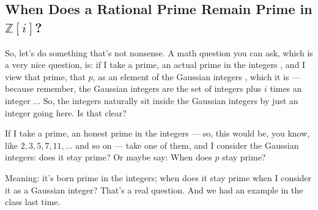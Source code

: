 \subsection{When Does a Rational Prime Remain Prime in \texorpdfstring{$\mathbb{Z}[i]$}{Z[i]}?}

\begin{speech}[00:02:48 - 00:04:08]
So, let's do something that's not nonsense. A math question you can ask, which is a very nice question, is: if I take a prime, an actual prime in the integers , and I view that prime, that $p$, as an element of the Gaussian integers , which it is --- because remember, the Gaussian integers are the set of integers plus $i$ times an integer ... So, the integers naturally sit inside the Gaussian integers  by just an integer going here. Is that clear?

If I take a prime, an honest prime in the integers --- so, this would be, you know, like $2, 3, 5, 7, 11, \dots$  and so on --- take one of them, and I consider the Gaussian integers: does it stay prime? Or maybe say: When does $p$ stay prime? 

Meaning: it's born prime in the integers; when does it stay prime when I consider it as a Gaussian integer? That's a real question. And we had an example in the class last time.
\end{speech}


